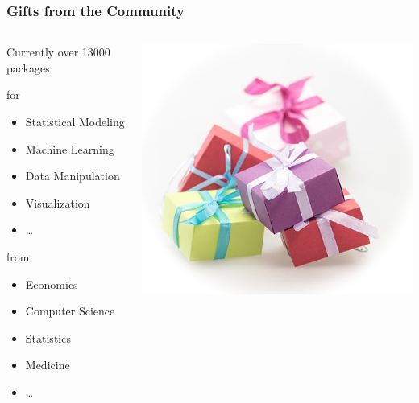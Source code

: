 \documentclass{beamer}\usepackage[]{graphicx}\usepackage[]{color}
\begin{document}
\begin{frame}
\frametitle{Gifts from the Community}

\begin{columns}[c]
	\begin{column}{.5\textwidth}
		Currently over 13000 packages \vspace{1em}

		for
		\begin{itemize}
			\item Statistical Modeling
			\item Machine Learning
			\item Data Manipulation
			\item Visualization
			\item \ldots
		\end{itemize}

		from
		\begin{itemize}
			\item Economics
			\item Computer Science
			\item Statistics
			\item Medicine
			\item \ldots
		\end{itemize}

	\end{column}
	\begin{column}{.5\textwidth}
		\includegraphics[width=\textwidth]{figures/packages.png}
	\end{column}
\end{columns}

\end{frame}
\end{document}
